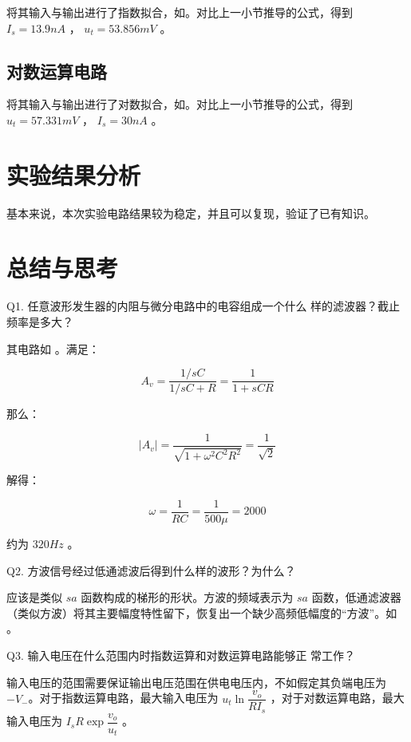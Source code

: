 \documentclass[lang=cn,11pt,a4paper,cite=authoryear]{elegantpaper}
\begin{document}
将其输入与输出进行了指数拟合，如。对比上一小节推导的公式，得到 \(I_s = 13.9 nA\) ， \(u_t = 53.856 mV\) 。


\subsection{对数运算电路}

将其输入与输出进行了对数拟合，如。对比上一小节推导的公式，得到 \(u_t = 57.331 mV\) ， \(I_s = 30 nA\) 。


\section{实验结果分析}

基本来说，本次实验电路结果较为稳定，并且可以复现，验证了已有知识。

\section{总结与思考}


Q1. 任意波形发生器的内阻与微分电路中的电容组成一个什么
样的滤波器？截止频率是多大？

其电路如  。满足：

\[A_v = \dfrac{1/sC}{1/sC + R} = \dfrac{1}{1 + s C R}\] 

那么：

\[|A_v| = \dfrac{1}{\sqrt{1 + \omega^2 C^2 R^2}} = \dfrac{1}{\sqrt{2}}\]

解得：

\[\omega = \dfrac{1}{RC} = \dfrac{1}{500 \mu} = 2000\] 

约为 \(320 Hz\) 。


Q2. 方波信号经过低通滤波后得到什么样的波形？为什么？

应该是类似 \(\mathit{sa}\) 函数构成的梯形的形状。方波的频域表示为 \(\mathit{sa}\) 函数，低通滤波器（类似方波）将其主要幅度特性留下，恢复出一个缺少高频低幅度的“方波”。如  。


Q3. 输入电压在什么范围内时指数运算和对数运算电路能够正
常工作？

输入电压的范围需要保证输出电压范围在供电电压内，不如假定其负端电压为 \(-V_{-}\)。对于指数运算电路，最大输入电压为 \(u_t \ln \dfrac{v_o}{R I_s}\) ，对于对数运算电路，最大输入电压为 \(I_s R \exp \dfrac{v_o}{u_t}\) 。



\end{document}
